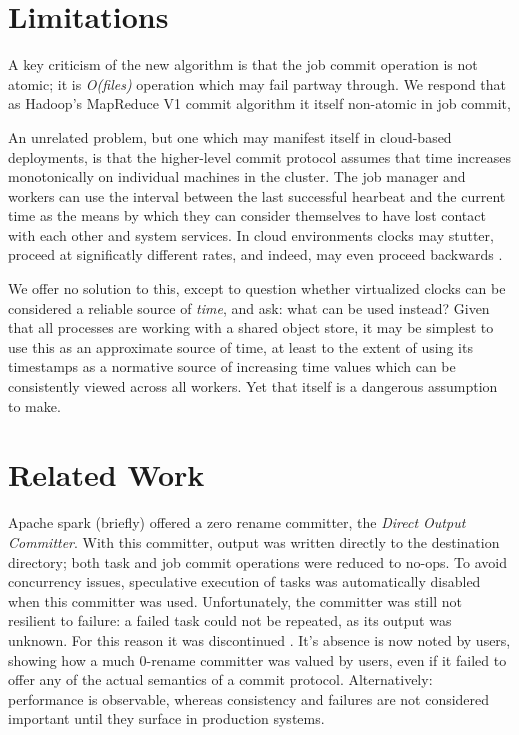 \documentclass[9pt,technote]{IEEEtran}
\begin{document}
\section{Limitations}

A key criticism of the new algorithm is that the job commit operation is not atomic; it is \emph{O(files)} operation which may fail partway through. We respond that as Hadoop's MapReduce V1 commit algorithm it itself non-atomic in job commit, 

An unrelated problem, but one which may manifest itself in cloud-based deployments, is that the higher-level commit protocol assumes that time increases monotonically on individual machines in the cluster. The job manager and workers can use the interval between the last successful hearbeat and the current time as the means by which they can consider themselves to have lost contact with each other and system services. In cloud environments clocks may stutter, proceed at significatly different rates, and indeed, may even proceed backwards \cite{anything?}. 

We offer no solution to this, except to question whether virtualized clocks can be considered a reliable source of \emph{time}, and ask: what can be used instead? Given that all processes are working with a shared object store, it may be simplest to use this as an approximate source of time, at least to the extent of using its timestamps as a normative source of increasing time values which can be consistently viewed across all workers. Yet that itself is a dangerous assumption to make. 

\section{Related Work}

Apache spark (briefly) offered a zero rename committer, the \emph{Direct Output Committer}\cite{JIRA}. With this committer, output was written directly to the destination directory; both task and job commit operations were reduced to no-ops. To avoid concurrency issues, speculative execution of tasks was automatically disabled when this committer was used. Unfortunately, the committer was still not resilient to failure: a failed task could not be repeated, as its output was unknown. For this reason it was discontinued \cite{DOC-JIRA}. It's absence is now noted by users, showing how a much 0-rename committer was valued by users, even if it failed to offer any of the actual semantics of a commit protocol. Alternatively: performance is observable, whereas consistency and failures are not considered important until they surface in production systems.
\end{document}
